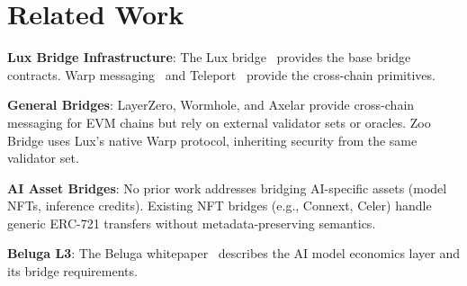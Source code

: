 \section{Related Work}


\textbf{Lux Bridge Infrastructure}: The Lux bridge~\cite{lux-bridge} provides the base bridge contracts. Warp messaging~\cite{lux-warp-messaging} and Teleport~\cite{lux-teleport-protocol} provide the cross-chain primitives.

\textbf{General Bridges}: LayerZero, Wormhole, and Axelar provide cross-chain messaging for EVM chains but rely on external validator sets or oracles. Zoo Bridge uses Lux's native Warp protocol, inheriting security from the same validator set.

\textbf{AI Asset Bridges}: No prior work addresses bridging AI-specific assets (model NFTs, inference credits). Existing NFT bridges (e.g., Connext, Celer) handle generic ERC-721 transfers without metadata-preserving semantics.

\textbf{Beluga L3}: The Beluga whitepaper~\cite{beluga-l3-whitepaper} describes the AI model economics layer and its bridge requirements.

